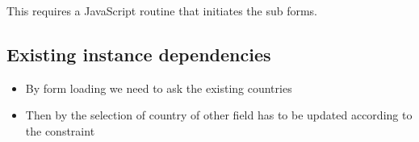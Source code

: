 This requires a JavaScript routine that initiates the sub forms. 



\subsection{Existing instance dependencies}



\begin{itemize}
	\item	By form loading we need to ask the existing countries
	\item 	Then by the selection of country of other field has to be updated according to the constraint
\end{itemize}


